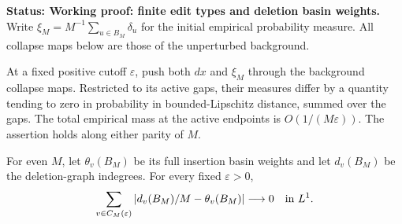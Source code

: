 \documentclass[11pt,letterpaper]{article}
\newcommand{\status}[1]{\textbf{Status: #1.}}
\begin{document}
\status{Working proof: finite edit types and deletion basin weights}
Write $\xi_M=M^{-1}\sum_{u\in B_M}\delta_u$ for the initial empirical
probability measure. All collapse maps below are those of the
unperturbed background.

\begin{lemma}
\label{lem:empirical-seed}
At a fixed positive cutoff $\varepsilon$, push both $dx$ and $\xi_M$
through the background collapse maps. Restricted to its active gaps,
their measures differ by a quantity tending to zero in probability
in bounded-Lipschitz distance, summed over the gaps.
The total empirical mass at the active endpoints is $O(1/(M\varepsilon))$.
The assertion holds along either parity of $M$.

For even $M$, let $\theta_v(B_M)$ be its full insertion basin weights
and let $d_v(B_M)$ be the deletion-graph indegrees. For every fixed
$\varepsilon>0$,
\begin{equation}\label{eq:late-deletion-masses}
 \sum_{v\in C_M(\varepsilon)}
       |d_v(B_M)/M-\theta_v(B_M)|
       \longrightarrow0\quad\hbox{in }L^1.
\end{equation}
\end{lemma}
\end{document}

